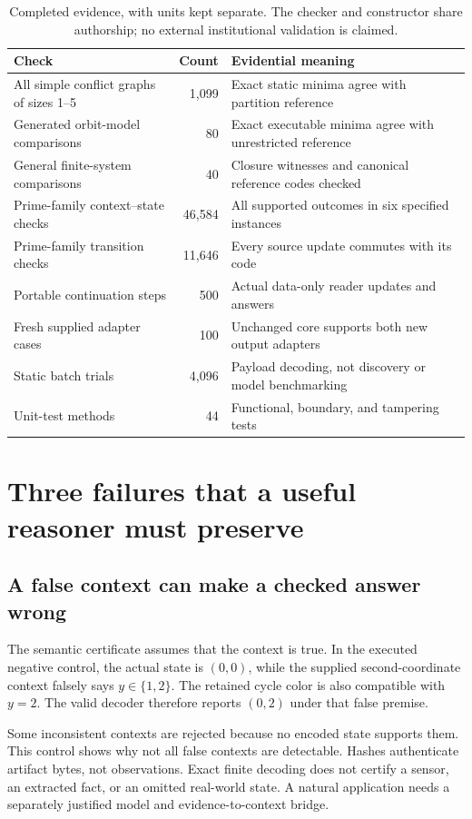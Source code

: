 \documentclass[11pt,letterpaper]{article}
\theoremstyle{remark}\newtheorem{remark}{Remark}[section]
\begin{document}
\begin{table}[htbp]\centering\small
\caption{Completed evidence, with units kept separate. The checker and constructor share authorship; no external institutional validation is claimed.}\label{tab:evidence}
\begin{tabularx}{\linewidth}{@{}YrY@{}}\toprule
Check & Count & Evidential meaning\\\midrule
All simple conflict graphs of sizes 1--5 & 1,099 & Exact static minima agree with partition reference\\
Generated orbit-model comparisons & 80 & Exact executable minima agree with unrestricted reference\\
General finite-system comparisons & 40 & Closure witnesses and canonical reference codes checked\\
Prime-family context--state checks & 46,584 & All supported outcomes in six specified instances\\
Prime-family transition checks & 11,646 & Every source update commutes with its code\\
Portable continuation steps & 500 & Actual data-only reader updates and answers\\
Fresh supplied adapter cases & 100 & Unchanged core supports both new output adapters\\
Static batch trials & 4,096 & Payload decoding, not discovery or model benchmarking\\
Unit-test methods & 44 & Functional, boundary, and tampering tests\\\bottomrule
\end{tabularx}
\end{table}

\section{Three failures that a useful reasoner must preserve}
\label{sec:failures}
\subsection{A false context can make a checked answer wrong}
The semantic certificate assumes that the context is true. In the executed negative control, the actual state is $(0,0)$, while the supplied second-coordinate context falsely says $y\in\{1,2\}$. The retained cycle color is also compatible with $y=2$. The valid decoder therefore reports $(0,2)$ under that false premise.

Some inconsistent contexts are rejected because no encoded state supports them. This control shows why not all false contexts are detectable. Hashes authenticate artifact bytes, not observations. Exact finite decoding does not certify a sensor, an extracted fact, or an omitted real-world state. A natural application needs a separately justified model and evidence-to-context bridge.
\end{document}
